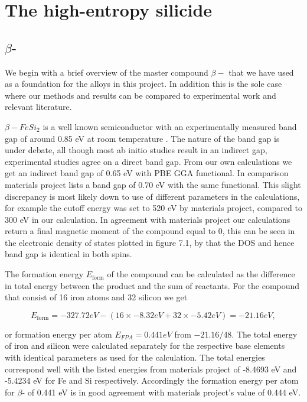 \chapter{The high-entropy silicide }
\label{sec:equi}

\section{$\beta$-}
We begin with a brief overview of the master compound $\beta-$ that we have used as a foundation for the alloys in this project. In addition this is the sole case where our methods and results can be compared to experimental work and relevant literature.

$\beta-FeSi_2$ is a well known semiconductor with an experimentally measured band gap of around 0.85 eV at room temperature \cite{PhysRevB.58.10389}. The nature of the band gap is under debate, all though most ab initio studies result in an indirect gap, experimental studies agree on a direct band gap. From our own calculations we get an indirect band gap of 0.65 eV with PBE GGA functional. In comparison materials project lists a band gap of 0.70 eV with the same functional. This slight discrepancy is most likely down to use of different parameters in the calculations, for example the cutoff energy was set to 520 eV by materials project, compared to 300 eV in our calculation. In agreement with materials project our calculations return a final magnetic moment of the compound equal to 0, this can be seen in the electronic density of states plotted in figure 7.1, by that the DOS and hence band gap is identical in both spins.   

The formation energy $E_\text{form}$ of the compound can be calculated as the difference in total energy between the product and the sum of reactants. For the  compound that consist of 16 iron atoms and 32 silicon we get 

\begin{equation*}
E_\text{form} = -327.72 eV - (16 \times -8.32 eV + 32 \times -5.42 eV) = -21.16 eV, 
\end{equation*}

or formation energy per atom $E_{FPA} = 0.441 eV$ from $-21.16/48$. The total energy of iron and silicon were calculated separately for the respective base elements with identical parameters as used for the  calculation. The total energies correspond well with the listed energies from materials project of -8.4693 eV and -5.4234 eV for Fe and Si respectively. Accordingly the formation energy per atom for $\beta$- of 0.441 eV is in good agreement with materials project's value of 0.444 eV.

